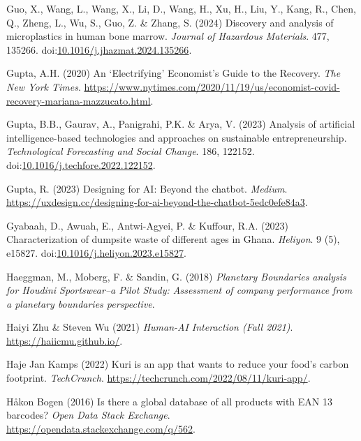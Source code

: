 \documentclass[
  letterpaper,
  DIV=11,
  numbers=noendperiod]{scrartcl}
\newlength{\cslhangindent}
\newenvironment{CSLReferences}[2] %
 {\begin{list}{}{%
  \setlength{\itemindent}{0pt}
  \setlength{\leftmargin}{0pt}
  \setlength{\parsep}{0pt}
  \ifodd #1
   \setlength{\leftmargin}{\cslhangindent}
   \setlength{\itemindent}{-1\cslhangindent}
  \fi
  \setlength{\itemsep}{#2\baselineskip}}}
 {\end{list}}
\begin{document}
\begin{CSLReferences}{0}{1}
Guo, X., Wang, L., Wang, X., Li, D., Wang, H., Xu, H., Liu, Y., Kang,
R., Chen, Q., Zheng, L., Wu, S., Guo, Z. \& Zhang, S. (2024) Discovery
and analysis of microplastics in human bone marrow. \emph{Journal of
Hazardous Materials}. 477, 135266.
doi:\href{https://doi.org/10.1016/j.jhazmat.2024.135266}{10.1016/j.jhazmat.2024.135266}.

Gupta, A.H. (2020) An {`{Electrifying}'} {Economist}'s {Guide} to the
{Recovery}. \emph{The New York Times}.
\url{https://www.nytimes.com/2020/11/19/us/economist-covid-recovery-mariana-mazzucato.html}.

Gupta, B.B., Gaurav, A., Panigrahi, P.K. \& Arya, V. (2023) Analysis of
artificial intelligence-based technologies and approaches on sustainable
entrepreneurship. \emph{Technological Forecasting and Social Change}.
186, 122152.
doi:\href{https://doi.org/10.1016/j.techfore.2022.122152}{10.1016/j.techfore.2022.122152}.

Gupta, R. (2023) Designing for {AI}: Beyond the chatbot. \emph{Medium}.
\url{https://uxdesign.cc/designing-for-ai-beyond-the-chatbot-5edc0efe84a3}.

Gyabaah, D., Awuah, E., Antwi-Agyei, P. \& Kuffour, R.A. (2023)
Characterization of dumpsite waste of different ages in {Ghana}.
\emph{Heliyon}. 9 (5), e15827.
doi:\href{https://doi.org/10.1016/j.heliyon.2023.e15827}{10.1016/j.heliyon.2023.e15827}.

Haeggman, M., Moberg, F. \& Sandin, G. (2018) \emph{Planetary
{Boundaries} analysis for {Houdini Sportswear}--a {Pilot Study}:
{Assessment} of company performance from a planetary boundaries
perspective}.

Haiyi Zhu \& Steven Wu (2021) \emph{Human-{AI Interaction} ({Fall}
2021)}. \url{https://haiicmu.github.io/}.

Haje Jan Kamps (2022) Kuri is an app that wants to reduce your food's
carbon footprint. \emph{TechCrunch}.
\url{https://techcrunch.com/2022/08/11/kuri-app/}.

Håkon Bogen (2016) Is there a global database of all products with {EAN}
13 barcodes? \emph{Open Data Stack Exchange}.
\url{https://opendata.stackexchange.com/q/562}.


\end{CSLReferences}
\end{document}
